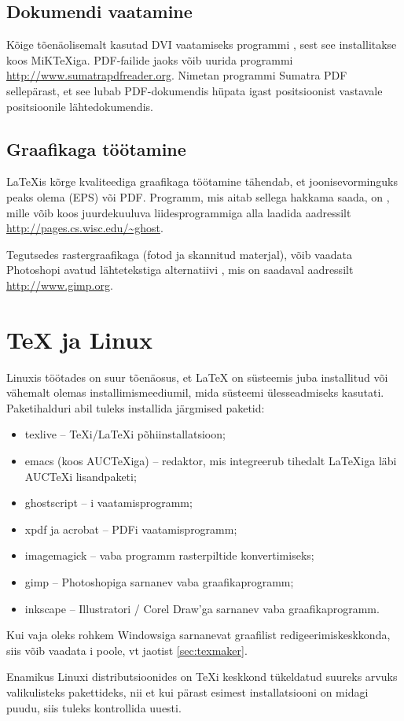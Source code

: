 \subsection{Dokumendi vaatamine}

Kõige tõenäolisemalt kasutad DVI vaatamiseks programmi , sest
see installitakse koos MiK\TeX iga. PDF-failide
jaoks võib uurida programmi 
\url{http://www.sumatrapdfreader.org}. Nimetan programmi Sumatra PDF
sellepärast, et see lubab PDF-dokumendis hüpata igast positsioonist
vastavale positsioonile lähtedokumendis.

\subsection{Graafikaga töötamine}

\LaTeX is kõrge kvaliteediga graafikaga töötamine tähendab, et
joonisevorminguks peaks olema \ePSi{} (EPS) või PDF.
Programm, mis aitab sellega hakkama saada, on , mille
võib koos juurdekuuluva liidesprogrammiga  alla laadida
aadressilt \url{http://pages.cs.wisc.edu/~ghost}.

Tegutsedes rastergraafikaga (fotod ja skannitud materjal), võib vaadata
Photoshopi avatud lähtetekstiga alternatiivi , mis on saadaval
aadressilt \url{http://www.gimp.org}.

\section{\TeX{} ja Linux}

Linuxis töötades on suur tõenäosus, et \LaTeX{} on süsteemis juba
installitud või vähemalt olemas installimismeediumil, mida
süsteemi ülesseadmiseks kasutati. Paketihalduri abil tuleks installida
järgmised paketid:

\begin{itemize}
\item texlive -- \TeX i/\LaTeX i põhiinstallatsioon;
\item emacs (koos AUCTeXiga) -- redaktor, mis integreerub tihedalt
\LaTeX iga läbi AUCTeXi lisandpaketi;
\item ghostscript -- \PSi i vaatamisprogramm;
\item xpdf ja acrobat -- PDFi vaatamisprogramm;
\item imagemagick -- vaba programm rasterpiltide konvertimiseks;
\item gimp -- Photoshopiga sarnanev vaba graafikaprogramm;
\item inkscape -- Illustratori / Corel Draw'ga sarnanev
vaba graafikaprogramm.
\end{itemize}

Kui vaja oleks rohkem Windowsiga sarnanevat graafilist
redigeerimiskeskkonda, siis võib vaadata i poole, vt
jaotist \ref{sec:texmaker}.

Enamikus Linuxi distributsioonides on \TeX i keskkond tükeldatud suureks
arvuks valikulisteks pakettideks, nii et kui pärast esimest
installatsiooni on midagi puudu, siis tuleks kontrollida uuesti.